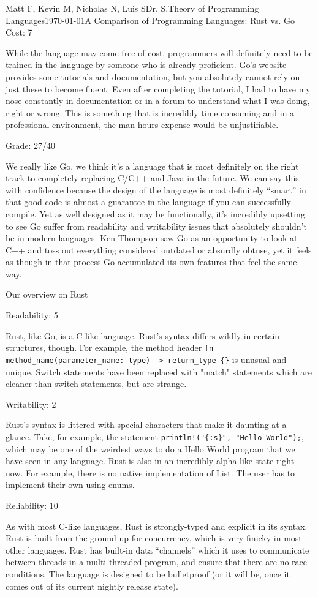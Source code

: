\documentclass[12pt,letterpaper]{article}
\begin{document}
\begin{mla}{Matt F, Kevin M, Nicholas N, Luis S}{}{Dr. S.}{Theory of Programming Languages}{\today}{A Comparison of Programming Languages: Rust vs. Go}
Cost: 7

While the language may come free of cost, programmers will definitely need to be trained in the language by someone who is already proficient. Go's website provides some tutorials and documentation, but you absolutely cannot rely on just these to become fluent. Even after completing the tutorial, I had to have my nose constantly in documentation or in a forum to understand what I was doing, right or wrong. This is something that is incredibly time consuming and in a professional environment, the man-hours expense would be unjustifiable.

Grade: 27/40

We really like Go, we think it's a language that is most definitely on the right track to completely replacing C/C++ and Java in the future. We can say this with confidence because the design of the language is most definitely ``smart'' in that good code is almost a guarantee in the language if you can successfully compile. Yet as well designed as it may be functionally, it's incredibly upsetting to see Go suffer from readability and writability issues that absolutely shouldn't be in modern languages. Ken Thompson saw Go as an opportunity to look at C++ and toss out everything considered outdated or absurdly obtuse, yet it feels as though in that process Go accumulated its own features that feel the same way.
      
Our overview on Rust

Readability: 5

Rust, like Go, is a C-like language. Rust's syntax differs wildly in certain structures, though. For example, the method header \texttt{fn method\_name(parameter\_name: type) -> return\_type \{<method body>\}} is unusual and unique. Switch statements have been replaced with "match" statements which are cleaner than switch statements, but are strange.

Writability: 2

Rust's syntax is littered with special characters that make it daunting at a glance. Take, for example, the statement \texttt{println!("\{:s\}", "Hello World");}, which may be one of the weirdest ways to do a Hello World program that we have seen in any language. Rust is also in an incredibly alpha-like state right now. For example, there is no native implementation of List. The user has to implement their own using enums.

Reliability: 10

As with most C-like languages, Rust is strongly-typed and explicit in its syntax. Rust is built from the ground up for concurrency, which is very finicky in most other languages. Rust has built-in data ``channels'' which it uses to communicate between threads in a multi-threaded program, and ensure that there are no race conditions. The language is designed to be bulletproof (or it will be, once it comes out of its current nightly release state).


\end{mla}
\end{document}
